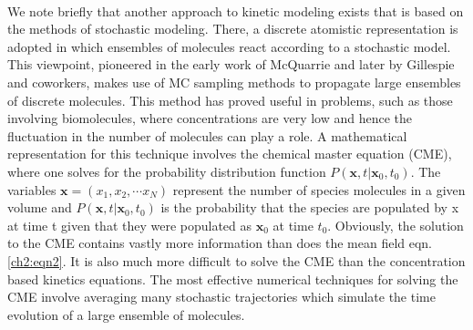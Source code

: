 \paragraph{}
We note briefly that another approach to kinetic modeling exists that is based on
the methods of stochastic modeling. There, a discrete atomistic representation is
adopted in which ensembles of molecules react according to a stochastic model.\cite{ch1_IRPC_33_van1992stochastic}
This viewpoint, pioneered in the early work of McQuarrie\cite{ch1_IRPC_34_mcquarrie1967stochastic} and later by Gillespie
and coworkers\cite{ch1_IRPC_35_gillespie1976general,ch1_IRPC_36_gillespie2013perspective,ch1_IRPC_37_gibson2000efficient}, makes use of MC sampling methods to propagate large ensembles
of discrete molecules. This method has proved useful in problems, such as those
involving biomolecules, where concentrations are very low and hence the fluctuation in
the number of molecules can play a role. A mathematical representation for this technique
involves the chemical master equation (CME), where one solves for the probability
distribution function $P\left( \mathbf{x},t\vert {\mathbf{x}}_0,t_0 \right)$. The variables $\mathbf{x} = (x_1,x_2,\cdots x_N)$ represent the
number of species molecules in a given volume and $P\left( \mathbf{x},t\vert {\mathbf{x}}_0,t_0 \right)$ is the probability that
the species are populated by x at time t given that they were populated as ${\mathbf{x}}_0$ at time $t_0$.
Obviously, the solution to the CME contains vastly more information than does the
mean field eqn. \ref{ch2:eqn2}. It is also much more difficult to solve the CME than the
concentration based kinetics equations. The most effective numerical techniques for
solving the CME involve averaging many stochastic trajectories which simulate the
time evolution of a large ensemble of molecules.

